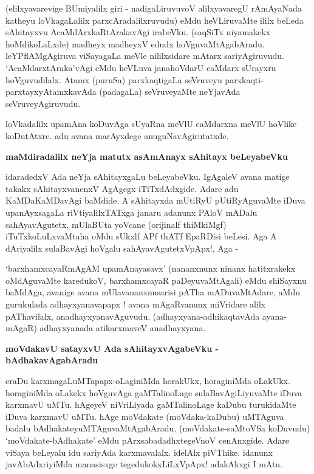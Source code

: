 \noindent
(elilxyavarevige BUmiyalilx giri - nadigaLiruvuvoV alilxyavaregU rAmA\-yaNada katheyu loVkagaLalilx parxcAradalilxruvudu) eMdu heVLiruvaMte ililx beLeda sAhitayxvu AcaMdArxkaRtArakavAgi ira\-beVku. (saqSiTx niyamakekx hoMdikoLaLxde) madheyx madheyxV edudx hoVguvaMtAgabAradu. leYPflAMgA\-giruva viSayagaLa meVle nililxsidare mAtarx sariyAgiruvudu. `AcaMdarxtAraka'vAgi eMdu heVLuva jana\-hoVdarU caMdarx sUrayxru hoVguvudilalx. Atamx (puruSa) parxkaqtigaLa seVruveyu parxkaqti-parxtayxyA\-tamxkavAda (padagaLa) seVruveyaMte neYjavAda seVruveyAgiru\break\-vudu. 

loVkadalilx upamAna koDuvAga sUyaRna meVlU caMdarxna meVlU hoVlike koDutAtxre. adu avana marAyxdege anuguNavAgiru\-tatxde.

\newpage

{\bigskip
\noindent
{\large\bf maMdiradalilx neYja matutx asAmAnayx sAhitayx beLeyabeVku}}
\medskip

\noindent
idaradedxV Ada neYja sAhitayxgaLu beLeyabeVku. IgAgaleV avana matige takakx sAhitayxvanenxV AgAgegx iTiTx\-dAdxgide. Adare adu KaMDaKaMDavAgi baMdide. A sAhitayxda mUtiRyU pUtiRyAguvaMte iDuva upa\-nAyxsagaLa riVtiyalilxTATxga janaru adanunx PAloV mADalu sahAyavAgutetx, mUlaBUta yoV\-cane (orijinalf thiMkiMgf) iTuTxkoLuLxvaMtaha oMdu sUkxlf APf thATf EpaRDisi beLesi. Aga A dAriyalilx sulaBavAgi hoVgalu sahAyavAgutetxVpApx!, Aga - 

`barxhamxcayaRmAgAM\label{78} upamAnayasavx' (nananxnunx ninanx hatitxrakekx oMdAguvaMte karedukoV, barxhamx\-cayaR paDeyuvaMtAgali) eMdu shiSayxnu baMdAga, avanige avana mUlavananxnusarisi pATha mADu\-vaMtAdare, aMdu gurukulada adhayxyana\-vapapx ! avana mAgaRvanunx miVridare alilx pAThavilalx, anadhayx\-yanavAguvudu. (adhayxyana-adhikaqtavAda ayana-mAgaR) adhayxyanada atikarxmaveV anadhayxyana.

{\bigskip
\noindent
{\large\bf moVdakavU satayxvU Ada sAhitayxvAgabeVku - bAdhakavAgabAradu}}\label{page78}
\medskip

\noindent
eraDu karxmagaLuMTapapx-oLaginiMda horakUkx, horaginiMda oLakUkx. horaginiMda oLakekx hoVgu\-vAga gaMTalinoLage sulaBavAgiLiyuvaMte iDuva karxmavU uMTu. hAgeyeV niVriLiyada gaMTali\-noLage kaDubu turukidaMte iDuva karxmavU uMTu. hAge moVdakate (moVdaka-kaDubu) uMTA\-guva badalu bAdhakateyuMTAguvaMtAgabAradu. (moVdakate-saMtoVSa koDuvudu) `moVdakate\--bAdha\-kate' eMdu pArxsabadadhxtegeVnoV cenAnxgide. Adare viSaya beLeyalu idu sariyAda karxmavalalx. idelAlx piVThike. idanunx javAbAdxriyiMda manasisxge tegedukokxLiLxVpApx! adakAkxgi I mAtu. 

